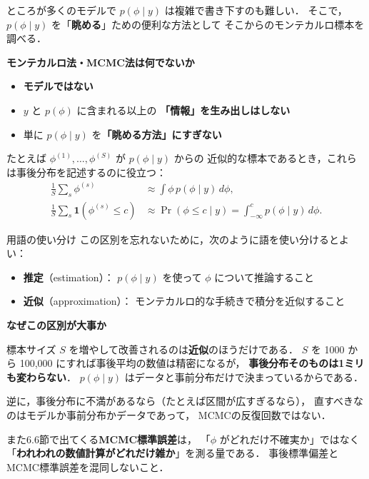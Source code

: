 \documentclass[lualatex,ja=standard,a4paper,12pt]{bxjsarticle}
\begin{document}
\medskip
ところが多くのモデルで $p(\phi \mid y)$ は複雑で書き下すのも難しい．
そこで，$p(\phi \mid y)$ を「\textbf{眺める}」ための便利な方法として
そこからのモンテカルロ標本を調べる．

\begin{warningbox}
\textbf{モンテカルロ法・MCMC法は何でないか}

\begin{itemize}
  \item \textbf{モデルではない}
  \item $y$ と $p(\phi)$ に含まれる以上の
        \textbf{「情報」を生み出しはしない}
  \item 単に $p(\phi \mid y)$ を\textbf{「眺める方法」にすぎない}
\end{itemize}

\medskip
たとえば $\phi^{(1)}, \ldots, \phi^{(S)}$ が $p(\phi \mid y)$ からの
近似的な標本であるとき，これらは事後分布を記述するのに役立つ：
\begin{align*}
  \frac{1}{S}\sum_s \phi^{(s)} &\approx \int \phi\, p(\phi \mid y)\, d\phi, \\[4pt]
  \frac{1}{S}\sum_s \mathbf{1}(\phi^{(s)} \le c)
    &\approx \Pr(\phi \le c \mid y) = \int_{-\infty}^{c} p(\phi \mid y)\, d\phi.
\end{align*}
\end{warningbox}

\begin{defbox}{用語の使い分け}
この区別を忘れないために，次のように語を使い分けるとよい：
\begin{itemize}
  \item \textbf{推定}（estimation）：
        $p(\phi \mid y)$ を使って $\phi$ について推論すること
  \item \textbf{近似}（approximation）：
        モンテカルロ的な手続きで積分を近似すること
\end{itemize}
\end{defbox}

\begin{pointbox}
\textbf{なぜこの区別が大事か}

標本サイズ $S$ を増やして改善されるのは\textbf{近似}のほうだけである．
$S$ を 1000 から 100{,}000 にすれば事後平均の数値は精密になるが，
\textbf{事後分布そのものは1ミリも変わらない}．
$p(\phi \mid y)$ はデータと事前分布だけで決まっているからである．

\medskip
逆に，事後分布に不満があるなら（たとえば区間が広すぎるなら），
直すべきなのはモデルか事前分布かデータであって，
MCMCの反復回数ではない．

\medskip
また6.6節で出てくる\textbf{MCMC標準誤差}は，
「$\phi$ がどれだけ不確実か」ではなく
「\textbf{われわれの数値計算がどれだけ雑か}」を測る量である．
事後標準偏差とMCMC標準誤差を混同しないこと．
\end{pointbox}
\end{document}
